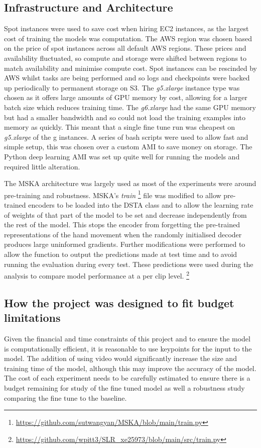 \documentclass{article}
\begin{document}
\subsection {Infrastructure and Architecture}
Spot instances were used to save cost when hiring EC2 instances, as the largest cost of training the models was computation. The AWS region was chosen based on the price of spot instances across all default AWS regions. These prices and availability fluctuated, so compute and storage were shifted between regions to match availability and minimise compute cost. Spot instances can be rescinded by AWS whilst tasks are being performed and so logs and checkpoints were backed up periodically to permanent storage on S3. The \emph{g5.xlarge} instance type was chosen as it offers large amounts of GPU memory by cost, allowing for a larger batch size which reduces training time. The \emph{g6.xlarge} had the same GPU memory but had a smaller bandwidth and so could not load the training examples into memory as quickly. This meant that a single fine tune run was cheapest on \emph{g5.xlarge} of the g instances. A series of bash scripts were used to allow fast and simple setup, this was chosen over a custom AMI to save money on storage. The Python deep learning AMI was set up quite well for running the models and required little alteration. 

The MSKA architecture was largely used as most of the experiments were around pre-training and robustness. MSKA's \emph{train} \footnote{\url{https://github.com/sutwangyan/MSKA/blob/main/train.py}} file was modified to allow pre-trained encoders to be loaded into the DSTA class and to allow the learning rate of weights of that part of the model to be set and decrease independently from the rest of the model. This stops the encoder from forgetting the pre-trained representations of the hand movement when the randomly initialised decoder produces large uninformed gradients. Further modifications were performed to allow the function to output the predictions made at test time and to avoid running the evaluation during every test. These predictions were used during the analysis to compare model performance at a per clip level. \footnote{\url{https://github.com/wpitt3/SLR\_xe25973/blob/main/src/train.py}}

\subsection{How the project was designed to fit budget limitations}
Given the financial and time constraints of this project and to ensure the model is computationally efficient, it is reasonable to use keypoints for the input to the model. The addition of using video would significantly increase the size and training time of the model, although this may improve the accuracy of the model. The cost of each experiment needs to be carefully estimated to ensure there is a budget remaining for study of the fine tuned model as well a robustness study comparing the fine tune to the baseline.
\end{document}

